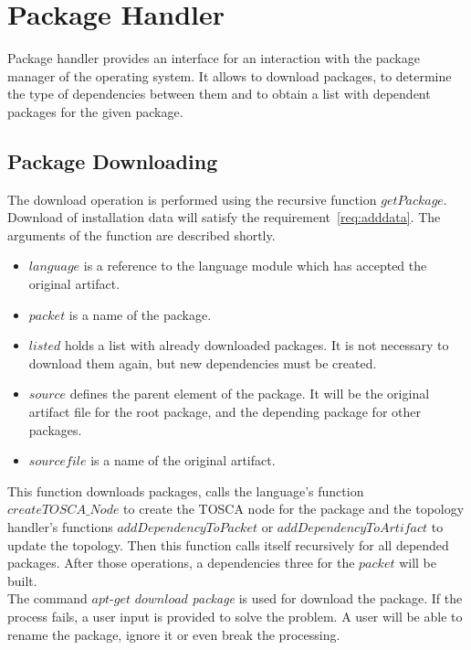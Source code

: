 \section{Package Handler}
Package handler provides an interface for an interaction with the package manager of the operating system.
It allows to download packages, to determine the type of dependencies between them and to obtain a list with dependent packages for the given package.

\subsection*{Package Downloading}
The download operation is performed using the recursive function $getPackage$. 
Download of installation data will satisfy the requirement~\ref{req:adddata}. %
The arguments of the function are described shortly.
\begin{itemize}
	\item $language$ is a reference to the language module which has accepted the original artifact.
	\item $packet$ is a name of the package.
	\item $listed$ holds a list with already downloaded packages.
	 It is not necessary to download them again, but new dependencies must be created.
	\item $source$ defines the parent element of the package. 
	It will be the original artifact file for the root package, and the depending package for other packages.
	\item $sourcefile$ is a name of the original artifact.
\end{itemize}
This function downloads packages, calls the language's function $createTOSCA\_Node$ to create the TOSCA node for the package and the topology handler's functions $addDependencyToPacket$ or $addDependencyToArtifact$ to update the topology. Then this function calls itself recursively for all depended packages.
After those operations, a dependencies three for the $packet$ will be built.\\
The command $apt$-$get$ $download$ \emph{package} is used for download the package. 
If the process fails, a user input is provided to solve the problem. 
A user will be able to rename the package, ignore it or even break the processing.

